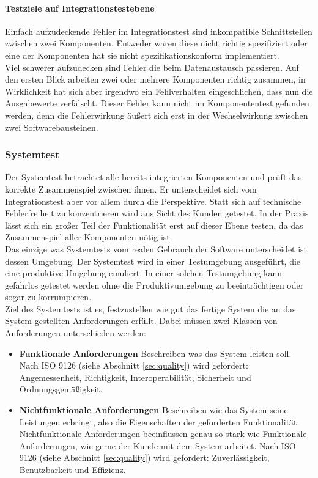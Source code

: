 \paragraph{Testziele auf Integrationstestebene}
Einfach aufzudeckende Fehler im Integrationstest sind inkompatible Schnittstellen zwischen zwei Komponenten. Entweder waren diese nicht richtig spezifiziert oder eine der Komponenten hat sie nicht spezifikationskonform implementiert.\\
Viel schwerer aufzudecken sind Fehler die beim Datenaustausch passieren. Auf den ersten Blick arbeiten zwei oder mehrere Komponenten richtig zusammen, in Wirklichkeit hat sich aber irgendwo ein Fehlverhalten eingeschlichen, dass nun die Ausgabewerte verfälscht. Dieser Fehler kann nicht im Komponententest gefunden werden, denn die Fehlerwirkung äußert sich erst in der Wechselwirkung zwischen zwei Softwarebausteinen\cite{spillner_basiswissen_2012}.


\subsubsection{Systemtest}
Der Systemtest betrachtet alle bereits integrierten Komponenten und prüft das korrekte Zusammenspiel zwischen ihnen. Er unterscheidet sich vom Integrationstest aber vor allem durch die Perspektive. Statt sich auf technische Fehlerfreiheit zu konzentrieren wird aus Sicht des Kunden getestet. In der Praxis lässt sich ein großer Teil der Funktionalität erst auf dieser Ebene testen, da das Zusammenspiel aller Komponenten nötig ist.\\
Das einzige was Systemtests vom realen Gebrauch der Software unterscheidet ist dessen Umgebung. Der Systemtest wird in einer Testumgebung ausgeführt, die eine produktive Umgebung emuliert. In einer solchen Testumgebung kann gefahrlos getestet werden ohne die Produktivumgebung zu beeinträchtigen oder sogar zu korrumpieren.\\
Ziel des Systemtests ist es, festzustellen wie gut das fertige System die an das System gestellten Anforderungen erfüllt. Dabei müssen zwei Klassen von Anforderungen unterschieden werden\cite{spillner_basiswissen_2012}:

\begin{itemize}
\item \textbf{Funktionale Anforderungen} Beschreiben was das System leisten soll. Nach ISO 9126 (siehe Abschnitt \ref{sec:quality}) wird gefordert: Angemessenheit, Richtigkeit, Interoperabilität, Sicherheit und Ordnungsgemäßigkeit.
\item \textbf{Nichtfunktionale Anforderungen} Beschreiben wie das System seine Leistungen erbringt, also die Eigenschaften der geforderten Funktionalität. Nichtfunktionale Anforderungen beeinflussen genau so stark wie Funktionale Anforderungen, wie gerne der Kunde mit dem System arbeitet. Nach ISO 9126 (siehe Abschnitt \ref{sec:quality}) wird gefordert: Zuverlässigkeit, Benutzbarkeit und Effizienz.
\end{itemize}


